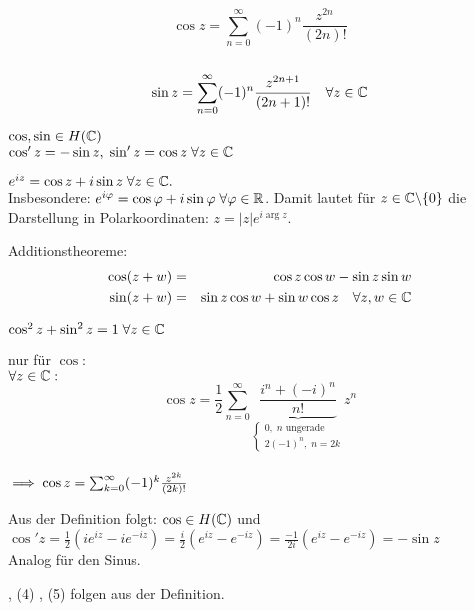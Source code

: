 \documentclass[a4paper,twoside,DIV15,BCOR12mm]{scrbook}
\begin{document}
\begin{satz} %
\begin{liste}
\item $$\cos z = \sum_{n=0}^{\infty}(-1)^n\frac{z^{2n}}{(2n)!}$$\\
$$\sin z = \sum_{n=0}^{\infty}(-1)^n\frac{z^{2n+1}}{(2n+1)!} \quad \forall z \in \mathbb{C}$$
\item $\cos , \sin \in H(\mathbb{C} )$\\
$\cos 'z = -\sin z,\; \sin 'z = \cos z \;\forall z \in \mathbb{C}$
\item $e^{iz} = \cos z + i\sin z \; \forall z \in \mathbb{C}.$ \\
Insbesondere: $e^{i\varphi} = \cos\varphi + i\sin\varphi \;\forall\varphi\in\mathbb{R}$. Damit lautet für $z \in \mathbb{C}\backslash\{0\}$ die Darstellung in Polarkoordinaten: $z = |z|e^{i\arg z}$.
\item Additionstheoreme:\begin{eqnarray}\notag\cos (z+w) &=& \cos z\cos w - \sin z\sin w \\
\notag \sin (z+w) &=& \sin z\cos w + \sin w\cos z \quad\forall z,w \in \mathbb{C} \end{eqnarray}
\item $\cos ^2z + \sin ^2z = 1 \;\forall z\in\mathbb{C}$
\end{liste}
\end{satz}







\begin{beweis}
\begin{liste}
\item nur für $\cos$: \\
$\forall z \in \mathbb{C} :$ 
$$\cos z = \frac{1}{2}\sum_{n=0}^{\infty}\underbrace{\frac{i^n + (-i)^n}{n!}}_{\begin{cases}0,\; n \text{ ungerade} \\ 2(-1)^n,\;n = 2k\end{cases}}z^n$$ \\
$\implies \cos z = \sum_{k=0}^{\infty}(-1)^k\frac{z^{2k}}{(2k)!}$
\item Aus der Definition folgt: $\cos \in H(\mathbb{C})$ und \\
$\cos 'z = \frac{1}{2}(ie^{iz} - ie^{-iz}) = \frac{i}{2}(e^{iz} - e^{-iz}) = \frac{-1}{2i}(e^{iz} - e^{-iz}) = -\sin z$ \\
Analog für den Sinus.
\item , (4) , (5) folgen aus der Definition.
\end{liste}
\end{beweis}
\end{document}
